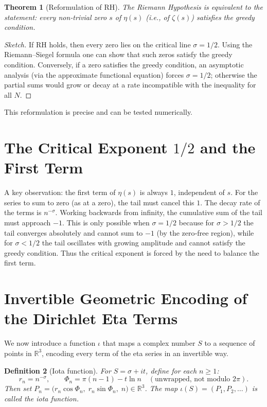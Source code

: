 \documentclass[12pt,a4paper]{article}
\newtheorem{theorem}{Theorem}[section]
\newtheorem{definition}[theorem]{Definition}
\begin{document}
\begin{theorem}[Reformulation of RH]
The Riemann Hypothesis is equivalent to the statement: every non‑trivial zero $s$ of $\eta(s)$ (i.e., of $\zeta(s)$) satisfies the greedy condition.
\end{theorem}

\begin{proof}[Sketch]
If RH holds, then every zero lies on the critical line $\sigma=1/2$. Using the Riemann–Siegel formula one can show that such zeros satisfy the greedy condition. Conversely, if a zero satisfies the greedy condition, an asymptotic analysis (via the approximate functional equation) forces $\sigma=1/2$; otherwise the partial sums would grow or decay at a rate incompatible with the inequality for all $N$.
\end{proof}

This reformulation is precise and can be tested numerically.

\section{The Critical Exponent $1/2$ and the First Term}

A key observation: the first term of $\eta(s)$ is always $1$, independent of $s$. For the series to sum to zero (as at a zero), the tail must cancel this $1$. The decay rate of the terms is $n^{-\sigma}$. Working backwards from infinity, the cumulative sum of the tail must approach $-1$. This is only possible when $\sigma=1/2$ because for $\sigma>1/2$ the tail converges absolutely and cannot sum to $-1$ (by the zero‑free region), while for $\sigma<1/2$ the tail oscillates with growing amplitude and cannot satisfy the greedy condition. Thus the critical exponent is forced by the need to balance the first term.

\section{Invertible Geometric Encoding of the Dirichlet Eta Terms}

We now introduce a function $\iota$ that maps a complex number $S$ to a sequence of points in $\mathbb{R}^3$, encoding every term of the eta series in an invertible way.

\begin{definition}[Iota function]
For $S=\sigma+it$, define for each $n\ge1$:
\[
r_n = n^{-\sigma},\qquad 
\Phi_n = \pi(n-1) - t\ln n \quad (\text{unwrapped, not modulo }2\pi).
\]
Then set $P_n = \bigl(r_n\cos\Phi_n,\; r_n\sin\Phi_n,\; n\bigr)\in\mathbb{R}^3$. The map $\iota(S) = (P_1,P_2,\dots)$ is called the iota function.
\end{definition}
\end{document}
